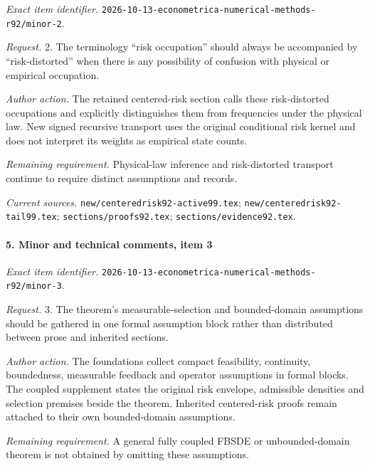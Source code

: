 \emph{Exact item identifier.} \nolinkurl{2026-10-13-econometrica-numerical-methods-r92/minor-2}.

\par\emph{Request.} 2. The terminology “risk occupation” should always be accompanied by “risk-distorted” when there is any possibility of confusion with physical or empirical occupation.

\par\emph{Author action.} The retained centered-risk section calls these risk-distorted occupations and explicitly distinguishes them from frequencies under the physical law. New signed recursive transport uses the original conditional risk kernel and does not interpret its weights as empirical state counts.

\par\emph{Remaining requirement.} Physical-law inference and risk-distorted transport continue to require distinct assumptions and records.

\par\emph{Current sources.} \nolinkurl{new/centeredrisk92-active99.tex}; \nolinkurl{new/centeredrisk92-tail99.tex}; \nolinkurl{sections/proofs92.tex}; \nolinkurl{sections/evidence92.tex}.

\paragraph{5. Minor and technical comments, item 3}

\emph{Exact item identifier.} \nolinkurl{2026-10-13-econometrica-numerical-methods-r92/minor-3}.

\par\emph{Request.} 3. The theorem's measurable-selection and bounded-domain assumptions should be gathered in one formal assumption block rather than distributed between prose and inherited sections.

\par\emph{Author action.} The foundations collect compact feasibility, continuity, boundedness, measurable feedback and operator assumptions in formal blocks. The coupled supplement states the original risk envelope, admissible densities and selection premises beside the theorem. Inherited centered-risk proofs remain attached to their own bounded-domain assumptions.

\par\emph{Remaining requirement.} A general fully coupled FBSDE or unbounded-domain theorem is not obtained by omitting these assumptions.

